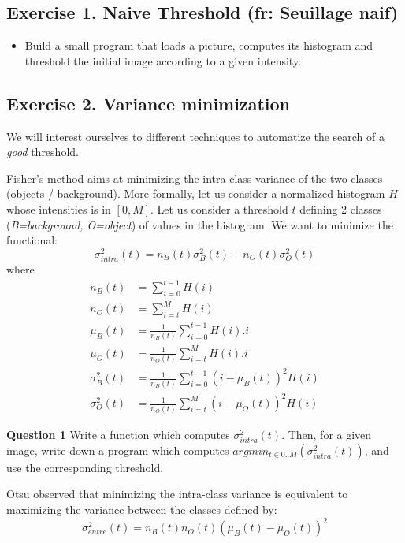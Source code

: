 \documentclass[a4paper, 11pt]{article}
\begin{document}
\subsection*{\bf Exercise 1. \rm Naive Threshold (fr: Seuillage naif)}

\begin{itemize}
	\item Build a small program that loads a picture, computes its histogram and threshold the initial image according to a given intensity.
\end{itemize}



\subsection*{\bf Exercise 2. \rm Variance minimization}

\par We will interest ourselves to different techniques to automatize the search of a \emph{good} threshold.

\par Fisher's method aims at minimizing the intra-class variance of the two classes (objects / background). More formally, let us consider a normalized histogram $H$ whose intensities is in $[0,M]$. Let us consider a threshold $t$ defining 2 classes (\emph{B=background, O=object}) of values in the histogram. We want to minimize the functional:
\begin{equation}
  \sigma^2_{intra}(t) = n_B(t)\sigma^2_B(t) + n_O(t)\sigma^2_O(t)
\end{equation}
where
\begin{align}
  n_B(t)  &= \sum_{i=0}^{t-1} H(i)\\
  n_O(t)  &= \sum_{i=t}^{M} H(i)\\
\mu_B(t) &= \frac{1}{n_B(t)} \sum_{i=0}^{t-1} H(i).i\\
\mu_O(t) &= \frac{1}{n_O(t)} \sum_{i=t}^{M} H(i).i\\
\sigma^2_B(t) &= \frac{1}{n_B(t)} \sum_{i=0}^{t-1}(i-\mu_B(t))^2 H(i)\\
\sigma^2_O(t) &= \frac{1}{n_O(t)} \sum_{i=t}^{M}(i-\mu_O(t))^2 H(i)
\end{align}


{\bf Question 1} Write a function which computes $\sigma^2_{intra}(t)$. Then, for a given image, write down a program which computes $argmin_{t\in{0..M}}(\sigma^2_{intra}(t))$, and use the corresponding threshold.

\smallskip
\par Otsu observed that minimizing the intra-class variance is equivalent to maximizing the variance between the classes defined by:
\begin{equation}
   \sigma^2_{entre}(t) = n_B(t)n_O(t)\left(\mu_B(t) - \mu_O(t) \right ) ^2
\end{equation}
\end{document}
